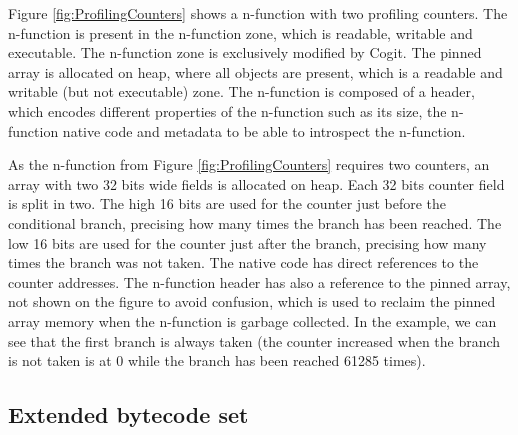 \documentclass[a4paper,12pt,twoside]{../includes/ThesisStyle}
\begin{document}
Figure \ref{fig:ProfilingCounters} shows a n-function with two profiling counters. The n-function is present in the n-function zone, which is readable, writable and executable. The n-function zone is exclusively modified by Cogit. The pinned array is allocated on heap, where all objects are present, which is a readable and writable (but not executable) zone. The n-function is composed of a header, which encodes different properties of the n-function such as its size, the n-function native code and metadata to be able to introspect the n-function. 

As the n-function from Figure \ref{fig:ProfilingCounters} requires two counters, an array with two 32 bits wide fields is allocated on heap. Each 32 bits counter field is split in two. The high 16 bits are used for the counter just before the conditional branch, precising how many times the branch has been reached. The low 16 bits are used for the counter just after the branch, precising how many times the branch was not taken. The native code has direct references to the counter addresses. The n-function header has also a reference to the pinned array, not shown on the figure to avoid confusion, which is used to reclaim the pinned array memory when the n-function is garbage collected. In the example, we can see that the first branch is always taken (the counter increased when the branch is not taken is at 0 while the branch has been reached 61285 times).

\subsection{Extended bytecode set}
\end{document}

